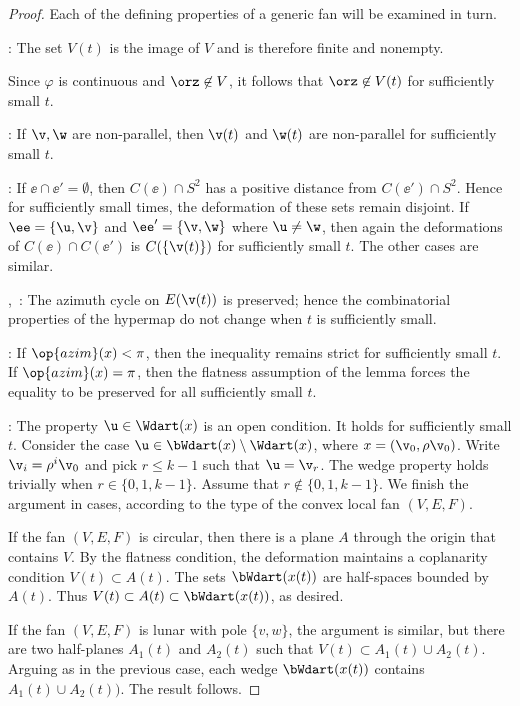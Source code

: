 \begin{proof} Each of the defining properties of a generic fan will be
examined in turn.

: The set $V(t)$ is the image of $V$ and is
therefore finite and nonempty.

 Since $\varphi$ is continuous and
$\orz\not\in V$, it follows that $\orz\not\in V(t)$ for sufficiently
small $t$.

: If $\v,\w$ are non-parallel, then $\v(t)$ and
$\w(t)$ are non-parallel for sufficiently small $t$.

: If $\ee \cap \ee'=\emptyset$, then $C(\ee)\cap
S^2$ has a positive distance from $C(\ee')\cap S^2$.  Hence for
sufficiently small times, the deformation of these sets remain
disjoint.  If $\ee=\{\u,\v\}$ and $\ee'=\{\v,\w\}$ where $\u\ne\w$,
then again the deformations of $C(\ee)\cap C(\ee')$ is
$C(\{\v(t)\})$ for sufficiently small $t$.  The other cases are
similar.

,~: The azimuth cycle on $E(\v(t))$
is preserved; hence the combinatorial properties of the hypermap do
not change when $t$ is sufficiently small.

: If $\op{azim}(x)<\pi$, then the inequality remains
strict for sufficiently small $t$.  If $\op{azim}(x)=\pi$, then the
flatness assumption of the lemma forces the equality to be
preserved for all sufficiently small $t$.

: The property $\u\in \Wdart(x)$ is an open condition.
It holds for sufficiently small $t$. Consider the case $\u\in
\bWdart(x)\setminus \Wdart(x)$, where $x= (\v_0,\rho\v_0)$.  Write
$\v_i = \rho^i\v_0$ and pick $r\le k-1$ such that $\u = \v_r$.  The
wedge property holds trivially when $r\in\{0,1,k-1\}$. Assume that
$r\not\in\{0,1,k-1\}$.  We finish the argument in cases, according to 
the type of the convex local fan  $(V,E,F)$.

If the fan $(V,E,F)$ is circular, then there is a plane $A$ through
the origin that contains $V$.  By the flatness condition, the
deformation maintains a coplanarity condition $V(t)\subset A(t)$.  The
sets $\bWdart(x(t))$ are half-spaces bounded by $A(t)$.  Thus
$V(t)\subset A(t)\subset \bWdart(x(t))$, as desired.

If the fan $(V,E,F)$ is lunar with pole $\{v,w\}$, the argument is
similar, but there are two half-planes $A_1(t)$ and $A_2(t)$ such that
$V(t)\subset A_1(t)\cup A_2(t)$.  Arguing as in the previous case,
each wedge $\bWdart(x(t))$ contains $A_1(t)\cup A_2(t))$.  The result
follows.


\end{proof}
